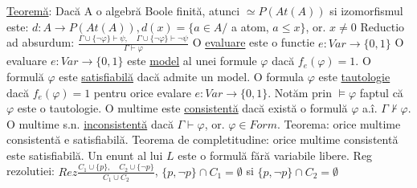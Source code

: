 \documentclass[8pt,twocolumn]{extarticle}
\begin{document}
	\underline{Teoremă}: Dacă A o algebră Boole finită, atunci $\simeq P(A t(A))$ si izomorfismul este: $d: A \rightarrow P(A t(A)), d(x) = \{ a \in A /$ a atom, $a \leq x \}$, or. $x \neq 0$ \newline
	Reductio ad absurdum: $\frac{\Gamma \cup \{ \neg \varphi \} \vdash \psi,\quad\Gamma \cup \{ \neg \varphi \} \vdash \neg \psi}{\Gamma \vdash \varphi}$ \newline
	O \underline{evaluare} este o functie $e: Var \to \{ 0, 1 \}$ \newline
	O evaluare $e: Var \to \{ 0, 1 \}$ este \underline{model} al unei formule $\varphi$ dacă $f_{e}(\varphi) = 1$. \newline
	O formulă $\varphi$ este \underline{satisfiabilă} dacă admite un model. \newline
	O formula $\varphi$ este \underline{tautologie} dacă $f_{e}(\varphi) = 1$ pentru orice evalare $e: Var \to \{ 0, 1 \}$. Notăm prin $\models \varphi$ faptul că $\varphi$ este o tautologie. \newline
	O multime este \underline{consistentă} dacă există o formulă $\varphi$ a.î. $\Gamma \not\vdash \varphi$. \newline
	O multime s.n. \underline{inconsistentă} dacă $\Gamma \vdash \varphi$, or. $\varphi \in Form$. \newline
	Teorema: orice multime consistentă e satisfiabilă. \newline
	Teorema de completitudine: orice multime consistentă este satisfiabilă. \newline
	Un enunt al lui $L$ este o formulă fără variabile libere. \newline
	Reg rezolutiei: $Rez\frac{C_{1} \cup \{p\},\quad C_{2} \cup \{\neg p\}}{C_{1} \cup C_{2}}$, $\{ p, \neg p \} \cap C_{1} = \emptyset$ si $\{ p, \neg p \} \cap C_{2} = \emptyset$
\end{document}

